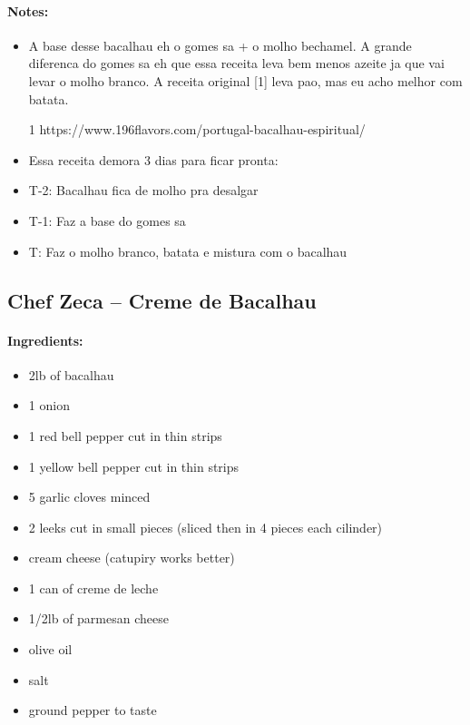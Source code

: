 \documentclass{article}
\begin{document}
\paragraph{Notes:}
\begin{itemize}
    \item A base desse bacalhau eh o gomes sa + o molho bechamel. A grande diferenca do gomes sa eh que essa receita leva bem menos azeite ja que vai levar o molho branco. A receita original [1] leva pao, mas eu acho melhor com batata.
    \item [1] https://www.196flavors.com/portugal-bacalhau-espiritual/
    \item Essa receita demora 3 dias para ficar pronta:
    \item T-2: Bacalhau fica de molho pra desalgar
    \item T-1: Faz a base do gomes sa
    \item T: Faz o molho branco, batata e mistura com o bacalhau
\end{itemize}

\subsection{Chef Zeca – Creme de Bacalhau}

\paragraph{Ingredients:}
\begin{itemize}
    \item 2lb of bacalhau
    \item 1 onion
    \item 1 red bell pepper cut in thin strips
    \item 1 yellow bell pepper cut in thin strips
    \item 5 garlic cloves minced
    \item 2 leeks cut in small pieces (sliced then in 4 pieces each cilinder)
    \item cream cheese (catupiry works better)
    \item 1 can of creme de leche
    \item 1/2lb of parmesan cheese
    \item olive oil
    \item salt
    \item ground pepper to taste
\end{itemize}
\end{document}
